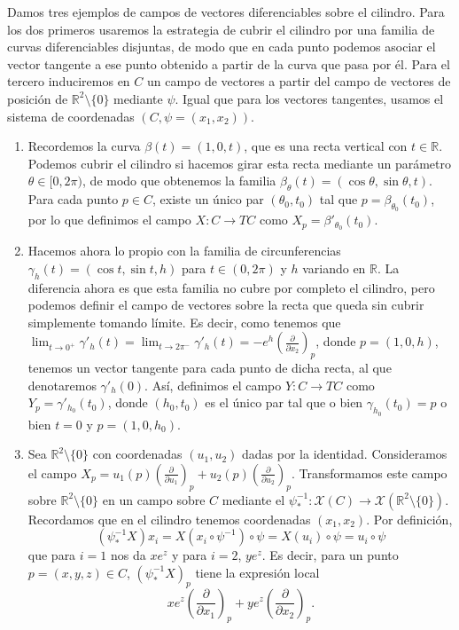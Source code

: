 \documentclass[twoside, 11pt]{article}
\theoremstyle{definition}
\newcommand{\R}{\mathbb{R}}
\newcommand{\parcial}[2]{\frac{\partial #1}{\partial #2}}
\begin{document}
Damos tres ejemplos de campos de vectores diferenciables sobre el cilindro. Para los dos primeros usaremos la estrategia de cubrir el cilindro por una familia de curvas diferenciables disjuntas, de modo que en cada punto podemos asociar el vector tangente a ese punto obtenido a partir de la curva que pasa por él. Para el tercero induciremos en $C$ un campo de vectores a partir del campo de vectores de posición de $\R^2\setminus\{0\}$ mediante $\psi$. Igual que para los vectores tangentes, usamos el sistema de coordenadas $(C,\psi=(x_1,x_2))$. 

\begin{enumerate}
\item
 Recordemos la curva $\beta(t)=(1,0,t)$, que es una recta vertical con $t\in\R$. Podemos cubrir el cilindro si hacemos girar esta recta mediante un parámetro $\theta\in[0,2\pi)$, de modo que obtenemos la familia $\beta_\theta(t)=(\cos\theta,\sin\theta, t)$. Para cada punto $p\in C$, existe un único par  $(\theta_0,t_0)$ tal que $p=\beta_{\theta_0}(t_0)$, por lo que definimos el campo $X:C\to TC$ como $X_p=\beta'_{\theta_0}(t_0)$.
 
\item Hacemos ahora lo propio con la familia de circunferencias $\gamma_h(t)=(\cos t,\sin t, h)$ para $t\in (0,2\pi)$ y $h$ variando en $\R$. La diferencia ahora es que esta familia no cubre por completo el cilindro, pero podemos definir el campo de vectores sobre la recta que queda sin cubrir simplemente tomando límite. Es decir, como tenemos que $\lim_{t\to 0^+}\gamma'_h(t)=\lim_{t\to 2\pi^-}\gamma'_h(t)=-e^h\left(\parcial{}{x_2}\right)_p$, donde $p=(1,0,h)$, tenemos un vector tangente para cada punto de dicha recta, al que denotaremos $\gamma'_h(0)$. Así, definimos el campo $Y:C\to TC$ como $Y_p=\gamma'_{h_0}(t_0)$, donde $(h_0, t_0)$ es el único par tal que o bien $\gamma_{h_0}(t_0)=p$ o bien $t=0$ y $p=(1,0,h_0)$. 

\item Sea $\R^2\setminus\{0\}$ con coordenadas $(u_1,u_2)$ dadas por la identidad. Consideramos el campo $X_p=u_1(p)\left(\parcial{}{u_1}\right)_p+u_2(p)\left(\parcial{}{u_2}\right)_p$. Transformamos este campo sobre $\R^2\setminus\{0\}$ en un campo sobre $C$ mediante el $\psi^{-1}_*:\mathcal{X}(C)\to\mathcal{X}(\R^2\setminus\{0\})$. Recordamos que en el cilindro tenemos coordenadas $(x_1,x_2)$. Por definición, 
\[
(\psi^{-1}_*X)x_i=X(x_i\circ \psi^{-1})\circ \psi=X(u_i)\circ\psi =u_i\circ\psi 
\]
que para $i=1$ nos da $xe^z$ y para $i=2$, $ye^z$. Es decir, para un punto $p=(x,y,z)\in C$, $(\psi^{-1}_*X)_p$ tiene la expresión local
\[
xe^z\left(\parcial{}{x_1}\right)_p+ye^z\left(\parcial{}{x_2}\right)_p.
\]
\end{enumerate}
\end{document}
